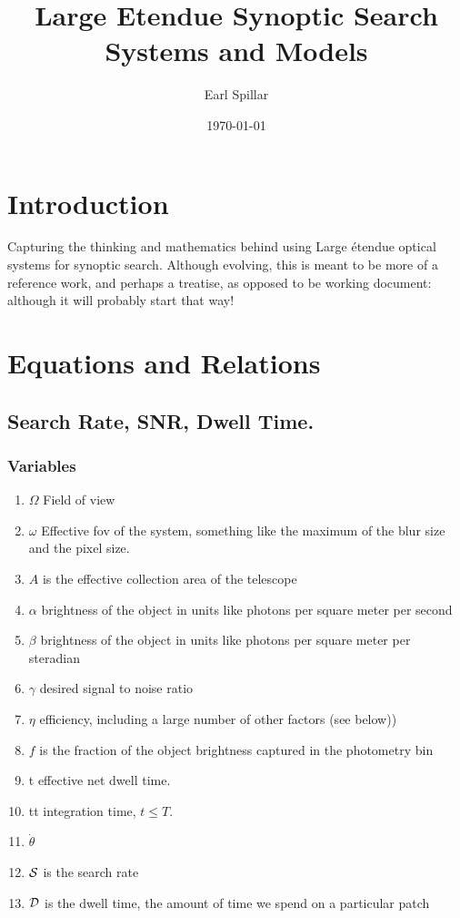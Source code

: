 \documentclass[12pt, letterpaper, onecolumn]{book}
\title{Large Etendue Synoptic Search Systems and Models}
\author{Earl Spillar}
\date{\today}
\begin{document}
\maketitle

\tableofcontents

\chapter{Introduction}
Capturing the thinking and mathematics behind using Large \'etendue optical
systems for synoptic search.  
Although evolving, this is meant to be more of a reference work, and perhaps a treatise, 
as opposed to be working document: although it will probably start that way!

\chapter{Equations and Relations}
\section{Search Rate, SNR, Dwell Time.}
\subsection{Variables}
\begin{enumerate}[noitemsep]
	\item $\Omega$ Field of view 
	\item $\omega$ Effective fov of the system, 
	something like the maximum of the blur size and the pixel size.
	\item $A$ is the effective collection area of the telescope
	\item $\alpha$ brightness of the object in units like
	photons per square meter per second
	\item $\beta$ brightness of the object in units like
	photons per square meter per steradian
	\item $\gamma$ desired signal to noise ratio
	\item $\eta$ efficiency, including a large number of other factors (see below))
	\item $f$ is the fraction of the object brightness captured in the photometry bin
	\item t effective net dwell time.
	\item tt integration time, $t \le T.$
	\item $\dot{\theta}$
	\item $\cal{S}$ is the search rate
	\item $\cal{D}$ is the dwell time, the amount of time
	we spend on a particular patch

\end{enumerate}
\end{document}
